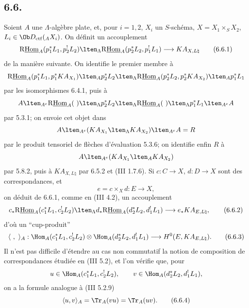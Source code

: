 \subsection*{6.6.}
Soient $A$ une $\Lambda$-algèbre plate, et, pour $i=1,2$, $X_i$ un $S$-schéma, $X=X_1\times_SX_2$, $L_i\in\Ob D_{\mathrm{ctf}}({}_AX_i)$. On définit un accouplement
\begin{equation}
\mathrm{R}\underline{\mathrm{Hom}}_A(p_1^*L_1,p_2^!L_2)
\lten_{\Lambda}
\mathrm{R}\underline{\mathrm{Hom}}_A(p_2^*L_2,p_1^!L_1)
\longrightarrow
KA_{X,L\natural}
\tag{6.6.1}
\end{equation}
de la manière suivante. On identifie le premier
membre à
\[
\mathrm{R}\underline{\mathrm{Hom}}_A(p_1^*L_1,p_1^*KA_{X_1})
\lten_A p_2^*L_2
\lten_{\Lambda}
\mathrm{R}\underline{\mathrm{Hom}}_A(p_2^*L_2,p_2^*KA_{X_2})
\lten_A p_1^*L_1
\]
par les isomorphismes 6.4.1, puis à
\[
A\lten_{A^e}\mathrm{R}\underline{\mathrm{Hom}}_A(\ )\lten_{\Lambda}p_2^*L_2
 \lten_{\Lambda}\mathrm{R}\underline{\mathrm{Hom}}_A(\ )\lten_{\Lambda}p_1^*L_1\lten_{A^e}A
\]
par 5.3.1; on envoie cet objet dans
\[
A\lten_{A^e}(KA_{X_1}\lten_{\Lambda}KA_{X_2})\lten_{A^e}A=R
\]
par le produit tensoriel de flèches d'évaluation 5.3.6; on identifie enfin $R$ à
\[
A\lten_{A^e}(KA_{X_1}\lten_A KA_{X_2})
\]
par 5.8.2, puis à $KA_{X,L\natural}$ par 6.5.2 et (III 1.7.6). Si $c:C\to X$, $d:D\to X$ sont des correspondances, et
\[
e=c\times_Xd:E\to X,
\]
on déduit de 6.6.1, comme en (III 4.2), un accouplement
\begin{equation}
c_*\mathrm{R}\underline{\mathrm{Hom}}_A(c_1^*L_1,c_2^!L_2)
\lten_{\Lambda}
d_*\mathrm{R}\underline{\mathrm{Hom}}_A(d_2^*L_2,d_1^!L_1)
\longrightarrow
e_*KA_{E,L\natural},
\tag{6.6.2}
\end{equation}
d'où un ``cup-produit''
\begin{equation}
\langle\ ,\ \rangle_A:
\Hom_A(c_1^*L_1,c_2^!L_2)\otimes
\Hom_A(d_2^*L_2,d_1^!L_1)
\longrightarrow
H^0(E,KA_{E,L\natural}).
\tag{6.6.3}
\end{equation}
Il n'est pas difficile d'étendre au cas non commutatif la notion de composition de correspondances étudiée en (III 5.2), et l'on vérifie que, pour
\[
u\in\Hom_A(c_1^*L_1,c_2^!L_2),\qquad
v\in\Hom_A(d_2^*L_2,d_1^!L_1),
\]
on a la formule analogue à (III 5.2.9)
\begin{equation}
\langle u,v\rangle_A=\Tr_A(vu)=\Tr_A(uv).
\tag{6.6.4}
\end{equation}


